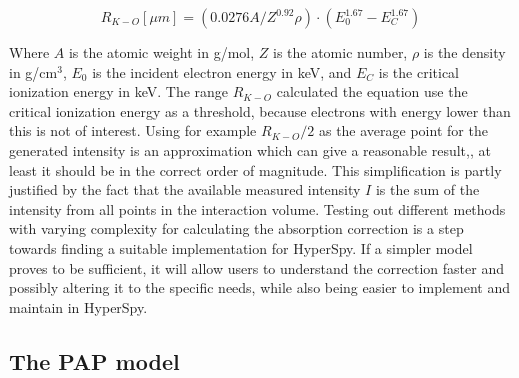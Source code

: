 \begin{equation}
    \label{eq:theory:quantitative:kanaya_okayama}
    R_{K-O} [\mu m] = (0.0276 A / Z ^{0.92} \rho) \cdot (E_0^{1.67} - E_C^{1.67})
\end{equation}

Where $A$ is the atomic weight in g/mol, $Z$ is the atomic number, $\rho$ is the density in g/cm$^3$, $E_0$ is the incident electron energy in keV, and $E_C$ is the critical ionization energy in keV.
The range $R_{K-O}$ calculated the equation use the critical ionization energy as a threshold, because electrons with energy lower than this is not of interest.
Using for example $R_{K-O}/2$ as the average point for the generated intensity is an approximation which can give a reasonable result,, at least it should be in the correct order of magnitude.
This simplification is partly justified by the fact that the available measured intensity $I$ is the sum of the intensity from all points in the interaction volume.
Testing out different methods with varying complexity for calculating the absorption correction is a step towards finding a suitable implementation for HyperSpy.
If a simpler model proves to be sufficient, it will allow users to understand the correction faster and possibly altering it to the specific needs, while also being easier to implement and maintain in HyperSpy.












\subsection{The PAP model}
\label{theory:quantitative:pap}



